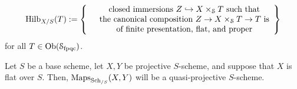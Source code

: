                 $$
                    \Hilb_{X/S}(T) :=
                    \left\{
                        \begin{array}{cc}
                             & \text{closed immersions $Z \hookrightarrow X \x_{\calS} T$ such that}
                             \\
                             & \text{the canonical composition $Z \to X \x_{\calS} T \to T$ is}
                             \\
                             & \text{of finite presentation, flat, and proper}
                        \end{array}
                    \right\}
                $$
            for all $T \in \mathrm{Ob}(\mathcal{S}_{\mathrm{fpqc}})$.
            \begin{theorem}
                Let $S$ be a base scheme, let $X, Y$ be projective $S$-scheme, and suppose that $X$ is flat over $S$. Then, $\mathrm{Maps}_{\mathrm{Sch}_{/S}}(X, Y)$ will be a quasi-projective $S$-scheme.
            \end{theorem}
